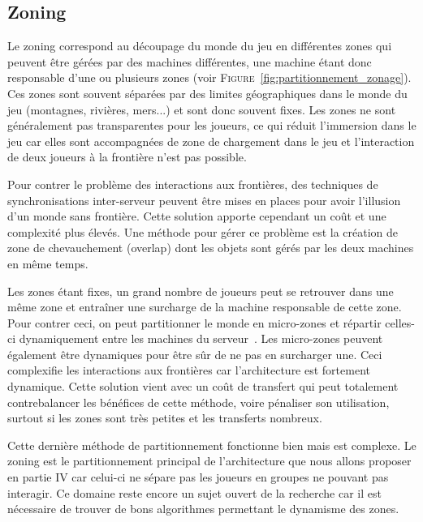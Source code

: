 \subsection{Zoning}
Le zoning correspond au découpage du monde du jeu en différentes zones qui peuvent être gérées par des machines différentes, une machine étant donc responsable d'une ou plusieurs zones (voir \textsc{Figure}~\ref{fig:partitionnement_zonage}).
Ces zones sont souvent séparées par des limites géographiques dans le monde du jeu (montagnes, rivières, mers...) et sont donc souvent fixes.
Les zones ne sont généralement pas transparentes pour les joueurs, ce qui réduit l'immersion dans le jeu car elles sont accompagnées de zone de chargement dans le jeu et l'interaction de deux joueurs à la frontière n'est pas possible.

Pour contrer le problème des interactions aux frontières, des techniques de synchronisations inter-serveur peuvent être mises en places pour avoir l'illusion d'un monde sans frontière.
Cette solution apporte cependant un coût et une complexité plus élevés.
Une méthode pour gérer ce problème est la création de zone de chevauchement (overlap) dont les objets sont gérés par les deux machines en même temps.\

Les zones étant fixes, un grand nombre de joueurs peut se retrouver dans une même zone et entraîner une surcharge de la machine responsable de cette zone.
Pour contrer ceci, on peut partitionner le monde en micro-zones et répartir celles-ci dynamiquement entre les machines du serveur~\cite{triangle_based_load_balancing}.
Les micro-zones peuvent également être dynamiques pour être sûr de ne pas en surcharger une.
Ceci complexifie les interactions aux frontières car l'architecture est fortement dynamique.
Cette solution vient avec un coût de transfert qui peut totalement contrebalancer les bénéfices de cette méthode, voire pénaliser son utilisation, surtout si les zones sont très petites et les transferts nombreux.

Cette dernière méthode de partitionnement fonctionne bien mais est complexe.
Le zoning est le partitionnement principal de l'architecture que nous allons proposer en partie IV car celui-ci ne sépare pas les joueurs en groupes ne pouvant pas interagir.
Ce domaine reste encore un sujet ouvert de la recherche car il est nécessaire de trouver de bons algorithmes permettant le dynamisme des zones.

